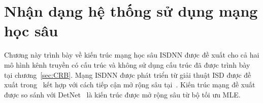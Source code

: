 \clearpage
{}

\setcounter{chapter}{2}
\chapter[NHẬN DẠNG HỆ THỐNG SỬ DỤNG MẠNG HỌC SÂU]{Nhận dạng hệ thống sử dụng mạng học sâu}
\label{sec:ML}


Chương này trình bày về kiến trúc mạng học sâu ISDNN được đề xuất cho cả hai mô hình kênh truyền có cấu trúc và không sử dụng cấu trúc đã được trình bày tại chương~\ref{sec:CRB}. Mạng ISDNN được phát triển từ giải thuật ISD được đề xuất trong~\cite{Mandloi2017} kết hợp với cách tiếp cận mở rộng sâu tại~\cite{Liao2020}. Kiến trúc mạng đề xuất được so sánh với DetNet~\cite{Samuel2017} là kiến trúc được mở rộng sâu từ bộ tối ưu MLE.

